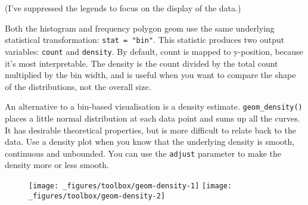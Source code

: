 (I've suppressed the legends to focus on the display of the data.)

Both the histogram and frequency polygon geom use the same underlying
statistical transformation: \texttt{stat\ =\ "bin"}. This statistic
produces two output variables: \texttt{count} and \texttt{density}. By
default, count is mapped to y-position, because it's most interpretable.
The density is the count divided by the total count multiplied by the
bin width, and is useful when you want to compare the shape of the
distributions, not the overall size. 

An alternative to a bin-based visualisation is a density estimate.
\texttt{geom\_density()} places a little normal distribution at each
data point and sums up all the curves. It has desirable theoretical
properties, but is more difficult to relate back to the data. Use a
density plot when you know that the underlying density is smooth,
continuous and unbounded. You can use the \texttt{adjust} parameter to
make the density more or less smooth. 

\begin{Shaded}
\begin{Highlighting}[]
\StringTok{  }\NormalTok{(} \NormalTok{) +}\StringTok{ }
\StringTok{  }\NormalTok{(}\NormalTok{, }\NormalTok{) +}\StringTok{ }
\StringTok{  }\NormalTok{(} \NormalTok{)}
  
\StringTok{  }\NormalTok{(} \NormalTok{, } \NormalTok{) +}\StringTok{ }
\StringTok{  }\NormalTok{(}\NormalTok{, }\NormalTok{) +}\StringTok{ }
\StringTok{  }\NormalTok{(} \NormalTok{)}
\end{Highlighting}
\end{Shaded}

\begin{figure}[H]
  \texttt{[image: \_figures/toolbox/geom-density-1]}%
  \texttt{[image: \_figures/toolbox/geom-density-2]}
\end{figure}

